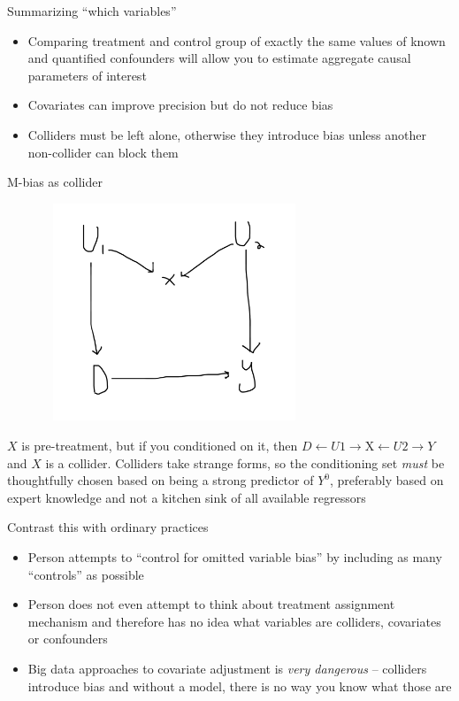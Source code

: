 \documentclass{beamer}
\begin{document}
\begin{frame}{Summarizing ``which variables''}

\begin{itemize}
\item Comparing treatment and control group of exactly the same values of known and quantified confounders will allow you to estimate aggregate causal parameters of interest
\item Covariates can improve precision but do not reduce bias
\item Colliders must be left alone, otherwise they introduce bias unless another non-collider can block them
\end{itemize}

\end{frame}

\begin{frame}{M-bias as collider}



  \centering
  \includegraphics[scale=0.5,height=6.5cm, width=10cm]{./lecture_includes/mbias}

\footnotesize
$X$ is pre-treatment, but if you conditioned on it, then $D\leftarrow U1 \rightarrow \mbox{X} \leftarrow U2 \rightarrow Y$ and $X$ is a collider. Colliders take strange forms, so the conditioning set \emph{must} be thoughtfully chosen based on being a strong predictor of $Y^0$, preferably based on expert knowledge and not a kitchen sink of all available regressors

\end{frame}



\begin{frame}{Contrast this with ordinary practices}

\begin{itemize}
\item Person attempts to ``control for omitted variable bias'' by including as many ``controls'' as possible
\item Person does not even attempt to think about treatment assignment mechanism and therefore has no idea what variables are colliders, covariates or confounders
\item Big data approaches to covariate adjustment is \emph{very dangerous} -- colliders introduce bias and without a model, there is no way you know what those are
\end{itemize}

\end{frame}
\end{document}
